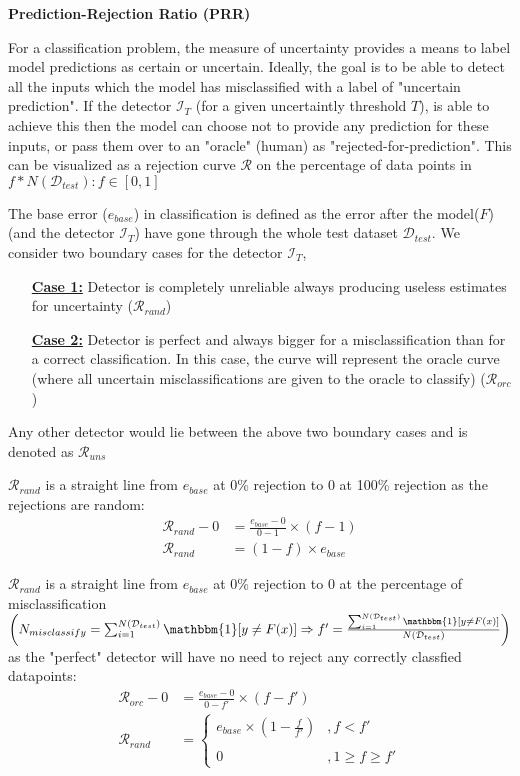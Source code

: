 \documentclass{article}
\begin{document}
\textbf{Prediction-Rejection Ratio (PRR)}

For a classification problem, the measure of uncertainty provides a means to label model predictions as certain or uncertain. Ideally, the goal is to be able to detect all the inputs which the model has misclassified with a label of "uncertain prediction". If the detector $\mathcal{I}_T$ (for a given uncertaintly threshold $T$), is able to achieve this then the model can choose not to provide any prediction for these inputs, or pass them over to an "oracle" (human) as "rejected-for-prediction". This can be visualized as a rejection curve $\mathcal{R}$ on the percentage of data points in $f * N(\mathcal{D}_{test}) : f \in [0,1]$

The base error ($e_{base}$) in classification is defined as the error after the model($F$) (and the detector $\mathcal{I}_T$) have gone through the whole test dataset $\mathcal{D}_{test}$. We consider two boundary cases for the detector $\mathcal{I}_T$,
\begin{itemize}
	\item[\textbf{\underline{Case 1:}}] Detector is completely unreliable always producing useless estimates for uncertainty ($\mathcal{R}_{rand}$)
	\item[\textbf{\underline{Case 2:}}] Detector is perfect and always bigger for a misclassification than for a correct classification. In this case, the curve will represent the oracle curve (where all uncertain misclassifications are given to the oracle to classify) ($\mathcal{R}_{orc}$)
\end{itemize}
Any other detector would lie between the above two boundary cases and is denoted as $\mathcal{R}_{uns}$

$\mathcal{R}_{rand}$ is a straight line from $e_{base}$ at 0\% rejection to 0 at 100\% rejection as the rejections are random:
\begin{align}
	\mathcal{R}_{rand} - 0 &= \frac{e_{base} - 0}{0 - 1} \times (f - 1) \\
	\mathcal{R}_{rand} &= (1 - f) \times e_{base}
\end{align}

$\mathcal{R}_{rand}$ is a straight line from $e_{base}$ at 0\% rejection to 0 at the percentage of misclassification $\left( N_{misclassify} = \sum_{i=1}^{N(\mathcal{D}_{test})} \mathbbm{1} [y \ne F(x)] \Rightarrow f' = \frac{\sum_{i=1}^{N(\mathcal{D}_{test})} \mathbbm{1} [y \ne F(x)]}{N(\mathcal{D}_{test})} \right)$ as the "perfect" detector will have no need to reject any correctly classfied datapoints:
\begin{align}
	\mathcal{R}_{orc} - 0 &= \frac{e_{base} - 0}{0 - f'} \times (f - f') \\
	\mathcal{R}_{rand} &= \left\{
		\begin{array}{ll}
			e_{base} \times (1 - \frac{f}{f'})  & ,f < f' \\ \\
			0  & ,1 \ge f \ge f' 
		\end{array}
	\right. 
\end{align}
\end{document}
